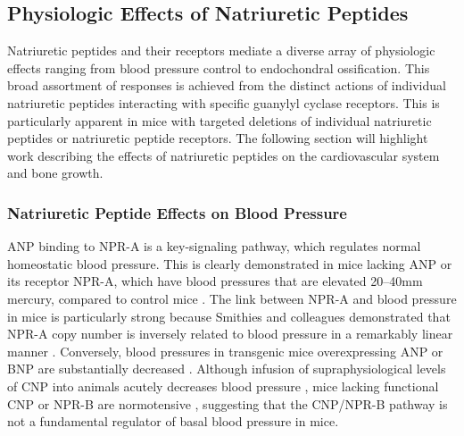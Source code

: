 \documentclass[14pt,a4paper,onecolumn]{article}
\begin{document}
\subsection{Physiologic Effects of Natriuretic Peptides}
Natriuretic peptides and their receptors mediate a diverse array of physiologic effects ranging from blood pressure control to endochondral ossification. This broad assortment of responses is achieved from the distinct actions of individual natriuretic peptides interacting with specific guanylyl cyclase receptors. This is particularly apparent in mice with targeted deletions of individual natriuretic peptides or natriuretic peptide receptors. The following section will highlight work describing the effects of natriuretic peptides on the cardiovascular system and bone growth.

\subsubsection{Natriuretic Peptide Effects on Blood Pressure}
ANP binding to NPR-A is a key-signaling pathway, which regulates normal homeostatic blood pressure. This is clearly demonstrated in mice lacking ANP or its receptor NPR-A, which have blood pressures that are elevated 20–40mm mercury, compared to control mice \citep{John1995} \citep{John1996} \citep{Lopez1995} \citep{Oliver1997}.
The link between NPR-A and blood pressure in mice is particularly strong because Smithies and colleagues demonstrated that NPR-A copy number is inversely related to blood pressure in a  remarkably linear manner \citep{Oliver1998}.
Conversely, blood pressures in transgenic mice overexpressing ANP or BNP are substantially decreased \citep{Ogawa1994a} \citep{Steinhelper1990}. Although infusion of supraphysiological levels of CNP into animals acutely decreases blood pressure \citep{Clavell1993} \citep{Sudoh1990}, mice lacking functional CNP or NPR-B are normotensive \citep{Chusho2001} \citep{Tamura2004}, suggesting that the CNP/NPR-B pathway is not a fundamental regulator of basal blood pressure in mice.
\end{document}
